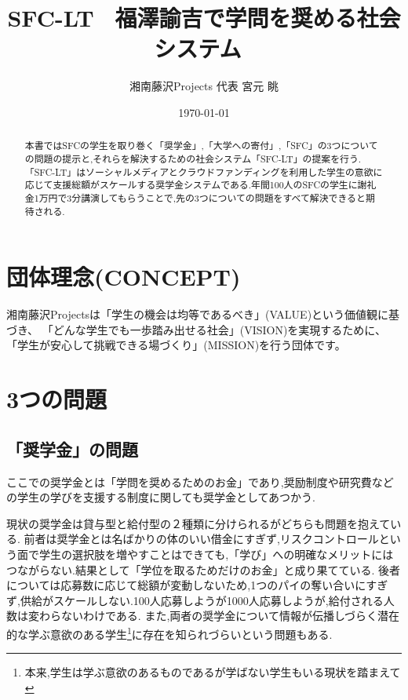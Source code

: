 \documentclass[uplatex, a4j]{jsarticle}
\date{\today}
\title{SFC-LT ~福澤諭吉で学問を奨める社会システム~}
\author{湘南藤沢Projects 代表 宮元 眺}
\begin{document}


\maketitle
\begin{abstract}
  本書ではSFCの学生を取り巻く「奨学金」,「大学への寄付」,「SFC」の3つについての問題の提示と,それらを解決するための社会システム「SFC-LT」の提案を行う.「SFC-LT」はソーシャルメディアとクラウドファンディングを利用した学生の意欲に応じて支援総額がスケールする奨学金システムである.年間100人のSFCの学生に謝礼金1万円で3分講演してもらうことで,先の3つについての問題をすべて解決できると期待される.

\end{abstract}

\section{団体理念(CONCEPT)}
湘南藤沢Projectsは「学生の機会は均等であるべき」(VALUE)という価値観に基づき、
「どんな学生でも一歩踏み出せる社会」(VISION)を実現するために、
「学生が安心して挑戦できる場づくり」(MISSION)を行う団体です。


\section{3つの問題}

\subsection{「奨学金」の問題}
  ここでの奨学金とは「学問を奨めるためのお金」であり,奨励制度や研究費などの学生の学びを支援する制度に関しても奨学金としてあつかう.

  現状の奨学金は貸与型と給付型の２種類に分けられるがどちらも問題を抱えている.
  前者は奨学金とは名ばかりの体のいい借金にすぎず,リスクコントロールという面で学生の選択肢を増やすことはできても,「学び」への明確なメリットにはつながらない.結果として「学位を取るためだけのお金」と成り果てている.
  後者については応募数に応じて総額が変動しないため,1つのパイの奪い合いにすぎず,供給がスケールしない.100人応募しようが1000人応募しようが,給付される人数は変わらないわけである.
  また,両者の奨学金について情報が伝播しづらく潜在的な学ぶ意欲のある学生\footnote{本来,学生は学ぶ意欲のあるものであるが学ばない学生もいる現状を踏まえて}に存在を知られづらいという問題もある.
\end{document}
